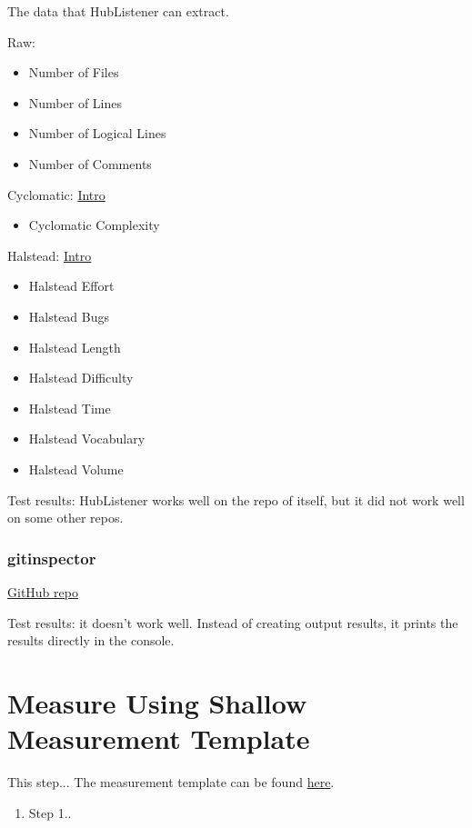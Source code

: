 \documentclass[letterpaper,cleveref]{lipics-v2019}
\theoremstyle{definition}
\begin{document}
The data that HubListener can extract.

Raw:
\begin{itemize}
\item Number of Files
\item Number of Lines
\item Number of Logical Lines
\item Number of Comments
\end{itemize}

Cyclomatic:
\href{https://www.geeksforgeeks.org/cyclomatic-complexity/}{Intro}
\begin{itemize}
\item Cyclomatic Complexity
\end{itemize}
 
Halstead:
\href{https://www.geeksforgeeks.org/software-engineering-halsteads-software-metrics/}{Intro}
\begin{itemize}
\item Halstead Effort
\item Halstead Bugs
\item Halstead Length
\item Halstead Difficulty
\item Halstead Time
\item Halstead Vocabulary
\item Halstead Volume
\end{itemize}

Test results: HubListener works well on the repo of itself, but it did not work
well on some other repos.

\subsubsection{gitinspector}
\href{https://github.com/ejwa/gitinspector}{GitHub repo}

Test results: it doesn't work well. Instead of creating output results, it
prints the results directly in the console.

\section{Measure Using Shallow Measurement Template} \label{SecShallowMeasure}
This step...
The measurement template can be found \href{run:Combined_MeasurementTemplate_EmpiricalMeasures.xlsx}{here}.
\begin{enumerate}
	\item Step 1..
\end{enumerate}
\end{document}
